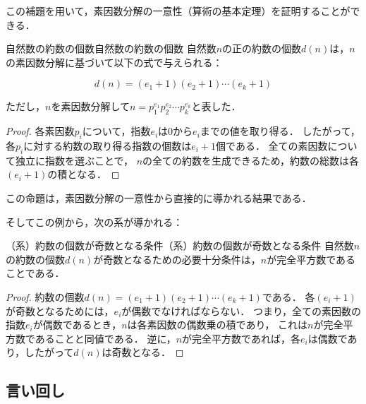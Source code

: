 \documentclass[a4paper,11pt]{ltjsarticle}
\newenvironment{tleftbar}{\begin{tbleftline}\setlength{\parindent}{1\zw}}{\end{tbleftline}}
\begin{document}
この補題を用いて，素因数分解の一意性（算術の基本定理）を証明することができる．

\begin{example}{自然数の約数の個数}{自然数の約数の個数}
  自然数$n$の正の約数の個数$d(n)$は，$n$の素因数分解に基づいて以下の式で与えられる：

  \begin{equation}
    d(n) = (e_1 + 1)(e_2 + 1) \dotsm (e_k + 1)
  \end{equation}

  ただし，$n$を素因数分解して$n = p_1^{e_1} p_2^{e_2} \dotsm p_k^{e_k}$と表した．
\end{example}

\begin{tleftbar}
  \begin{proof}
    各素因数$p_i$について，指数$e_i$は$0$から$e_i$までの値を取り得る．
    したがって，各$p_i$に対する約数の取り得る指数の個数は$e_i + 1$個である．
    全ての素因数について独立に指数を選ぶことで，
    $n$の全ての約数を生成できるため，約数の総数は各$(e_i + 1)$の積となる．
  \end{proof}
\end{tleftbar}

この命題は，素因数分解の一意性から直接的に導かれる結果である．

そしてこの例から，次の系が導かれる：

\begin{example}{（系）約数の個数が奇数となる条件}{（系）約数の個数が奇数となる条件}
  自然数$n$の約数の個数$d(n)$が奇数となるための必要十分条件は，$n$が完全平方数であることである．
\end{example}

\begin{tleftbar}
  \begin{proof}
    約数の個数$d(n) = (e_1 + 1)(e_2 + 1) \dotsm (e_k + 1)$である．
    各$(e_i + 1)$が奇数となるためには，$e_i$が偶数でなければならない．
    つまり，全ての素因数の指数$e_i$が偶数であるとき，$n$は各素因数の偶数乗の積であり，
    これは$n$が完全平方数であることと同値である．
    逆に，$n$が完全平方数であれば，各$e_i$は偶数であり，したがって$d(n)$は奇数となる．
  \end{proof}
\end{tleftbar}

\subsection{言い回し}
\end{document}
